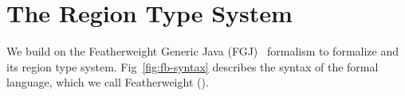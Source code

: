 \section{The Region Type System}
\label{sec:type-system}






We build on the Featherweight Generic Java (FGJ)~\cite{fgj} formalism
to formalize \name and its region type system.
Fig~\ref{fig:fb-syntax} describes the syntax of the formal language,
which we call {\sc Featherweight \name} (\FB). 
